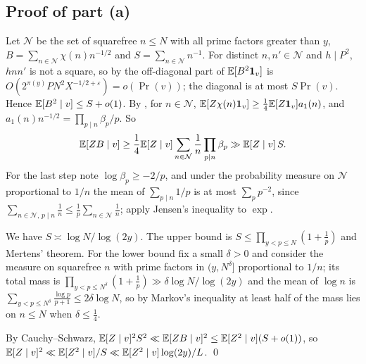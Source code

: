 \documentclass[11pt,colorlinks]{charlie}
\begin{document}
\subsection{Proof of part (a)}
Let $\mathcal N$ be the set of squarefree $n\le N$ with all prime factors greater than $y$, $B=\sum_{n\in\mathcal N}\chi(n)n^{-1/2}$ and $S=\sum_{n\in\mathcal N}n^{-1}$. For distinct $n,n'\in\mathcal N$ and $h\mid P^2$, $hnn'$ is not a square, so by  the off-diagonal part of $\mathbb{E}[B^2\mathbf{1}_v]$ is $O(2^{\pi(y)}PN^2X^{-1/2+\varepsilon})=o(\Pr(v))$; the diagonal is at most $S\Pr(v)$. Hence $\mathbb{E}[B^2\mid v]\le S+o(1)$. By , for $n\in\mathcal N$, $\mathbb{E}[Z\chi(n)\mathbf{1}_v]\ge\frac14\mathbb{E}[Z\mathbf{1}_v]a_1(n)$, and $a_1(n)n^{-1/2}=\prod_{p\mid n}\beta_p/p$. So
\[
 \mathbb{E}[ZB\mid v]\ge\frac14\mathbb{E}[Z\mid v]\sum_{n\in\mathcal N}\frac1n\prod_{p\mid n}\beta_p\gg\mathbb{E}[Z\mid v]\,S .
\]
For the last step note $\log\beta_p\ge-2/p$, and under the probability measure on $\mathcal N$ proportional to $1/n$ the mean of $\sum_{p\mid n}1/p$ is at most $\sum_pp^{-2}$, since $\sum_{n\in\mathcal N,\,p\mid n}\frac1n\le\frac1p\sum_{n\in\mathcal N}\frac1n$; apply Jensen's inequality to $\exp$.

We have $S\asymp\log N/\log(2y)$. The upper bound is $S\le\prod_{y<p\le N}(1+\frac1p)$ and Mertens' theorem. For the lower bound fix a small $\delta>0$ and consider the measure on squarefree $n$ with prime factors in $(y,N^\delta]$ proportional to $1/n$; its total mass is $\prod_{y<p\le N^\delta}(1+\frac1p)\gg\delta\log N/\log(2y)$ and the mean of $\log n$ is $\sum_{y<p\le N^\delta}\frac{\log p}{p+1}\le2\delta\log N$, so by Markov's inequality at least half of the mass lies on $n\le N$ when $\delta\le\frac14$.

By Cauchy--Schwarz, $\mathbb{E}[Z\mid v]^2S^2\ll\mathbb{E}[ZB\mid v]^2\le\mathbb{E}[Z^2\mid v](S+o(1))$, so $\mathbb{E}[Z\mid v]^2\ll\mathbb{E}[Z^2\mid v]/S\ll\mathbb{E}[Z^2\mid v]\log(2y)/L$. \qed
\end{document}
